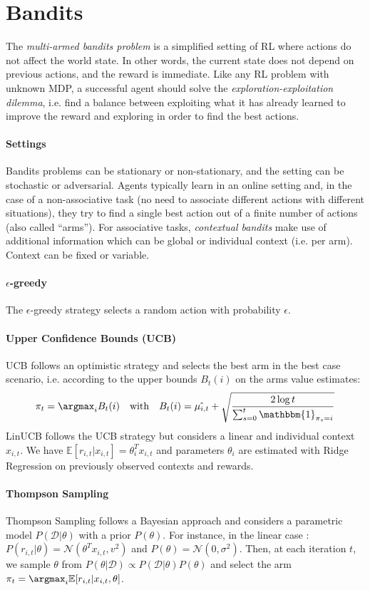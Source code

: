 \section{Bandits}
The \emph{multi-armed bandits problem} is a simplified setting of RL where actions do not affect the world state. In other words, the current state does not depend on previous actions, and the reward is immediate. Like any RL problem with unknown MDP, a successful agent should solve the \emph{exploration-exploitation dilemma}, i.e. find a balance between exploiting what it has already learned to improve the reward and exploring in order to find the best actions.

\paragraph{Settings}
Bandits problems can be stationary or non-stationary, and the setting can be stochastic or adversarial. Agents typically learn in an online setting and, in the case of a non-associative task (no need to associate different actions with different situations), they try to find a single best action out of a finite number of actions (also called “arms”). For associative tasks, \emph{contextual bandits} make use of additional information which can be global or individual context (i.e. per arm). Context can be fixed or variable.

\paragraph{$\epsilon$-greedy}
The $\epsilon$-greedy strategy selects a random action with probability $\epsilon$. 

\paragraph{Upper Confidence Bounds (UCB)}
UCB \cite{auer2002using} follows an optimistic strategy and selects the best arm in the best case scenario, i.e. according to the upper bounds $B_t(i)$ on the arms value estimates:
$$
\pi_t = \argmax_i B_t(i)
\quad \text{with} \quad
B_t(i) = \hat{\mu_{i,t}} + \sqrt{\frac{2 \log t}{\sum_{s=0}^t \mathbbm{1}_{\pi_s=i}}}
$$
LinUCB \cite{li2010contextual} follows the UCB strategy but considers a linear and individual context $x_{i,t}$. We have $\mathbb{E}[r_{i,t} | x_{i,t}] = \theta_i^T x_{i,t}$ and parameters $\theta_i$ are estimated with Ridge Regression on previously observed contexts and rewards.

\paragraph{Thompson Sampling}
Thompson Sampling \cite{kaufmann2012thompson} follows a Bayesian approach and considers a parametric model $P(\mathcal{D} | \theta)$ with a prior $P(\theta)$. For instance, in the linear case \cite{agrawal2013thompson}: $P(r_{i,t} | \theta) = \mathcal{N}(\theta^T x_{i,t}, v^2)$ and $P(\theta) = \mathcal{N}(0, \sigma^2)$. Then, at each iteration $t$, we sample $\theta$ from $P(\theta | \mathcal{D}) \propto P(\mathcal{D}|\theta) P(\theta)$ and select the arm $\pi_t = \argmax_i \mathbb{E}[r_{i,t} | x_{i,t}, \theta]$.